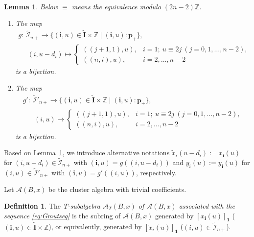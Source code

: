 \documentclass[pdftex]{sigma}
\numberwithin{equation}{section}
\newtheorem{Lemma}[Theorem]{Lemma}
\theoremstyle{definition}
\newtheorem{Definition}[Theorem]{Definition}
\begin{document}
\begin{Lemma}
\label{lem:gmapr}
Below $\equiv$ means the equivalence modulo $(2n-2)\mathbb{Z}$.

\begin{enumerate}\itemsep=0pt
\item[$(i)$] The map
\begin{gather*}
g:  \ \tilde{\mathcal{I}}_{n+} \rightarrow
\{ (\mathbf{i},u)\in \tilde{\mathbf{I}}\times \mathbb{Z} \mid
 (\mathbf{i},u): \mathbf{p}_+
\},\\
\phantom{g:  \ }{} \ (i,u-d_i) \mapsto
\begin{cases}
((j+1,1),u), & i= 1; \
u\equiv 2j
\ (j=0,1,\dots,n-2),\\
((n,i),u), & i=2,\dots,n-2
\end{cases}
\end{gather*}
is a bijection.

\item[$(ii)$]
The map
\begin{gather*}
g': \ \tilde{\mathcal{I}}'_{n+} \rightarrow
\{ (\mathbf{i},u)\in \tilde{\mathbf{I}}\times \mathbb{Z} \mid
 (\mathbf{i},u): \mathbf{p}_+
\},\\
\phantom{g': \ }{} \ (i,u) \mapsto
\begin{cases}
((j+1,1),u), & i= 1; \
u\equiv 2j
\ (j=0,1,\dots,n-2), \\
((n,i),u), & i=2,\dots,n-2
\end{cases}
\end{gather*}
is a bijection.
\end{enumerate}
\end{Lemma}

Based on Lemma~\ref{lem:gmapr},
we introduce alternative notations
$\tilde{x}_i(u-d_i):=x_{\mathbf{i}}(u)$
for $(i,u-d_i)\in \tilde{\mathcal{I}}_{n+}$
with  $(\mathbf{i},u)=g((i,u-d_i))$
and
$y_i(u):=y_{\mathbf{i}}(u)$
for $(i,u)\in \tilde{\mathcal{I}}'_{n+}$
with $(\mathbf{i},u)=g'((i,u))$,
respectively.



Let $\mathcal{A}(B,x)$ be the cluster algebra
with trivial coef\/f\/icients.

\begin{Definition}
\label{def:T-subr}
The {\em T-subalgebra
$\mathcal{A}_T(B,x)$
of ${\mathcal{A}}(B,x)$
associated with the sequence \eqref{eq:Gmutseq}}
is the subring of
${\mathcal{A}}(B,x)$
generated by
$[x_{\mathbf{i}}(u)]_{\mathbf{1}}$
($(\mathbf{i},u)\in \tilde{\mathbf{I}}\times \mathbb{Z}$),
or equivalently,
generated by
$[\tilde{x}_i(u)]_{\mathbf{1}}$
($(i,u)\in \tilde{\mathcal{I}}_{n+}$).
\end{Definition}
\end{document}
